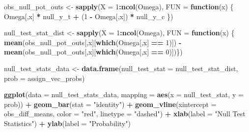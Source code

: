 \documentclass[12pt,leqno]{article}
\newenvironment{Shaded}{\begin{snugshade}}{\end{snugshade}}
\newcommand{\ControlFlowTok}[1]{\textcolor[rgb]{0.13,0.29,0.53}{\textbf{#1}}}
\newcommand{\DataTypeTok}[1]{\textcolor[rgb]{0.13,0.29,0.53}{#1}}
\newcommand{\DecValTok}[1]{\textcolor[rgb]{0.00,0.00,0.81}{#1}}
\newcommand{\KeywordTok}[1]{\textcolor[rgb]{0.13,0.29,0.53}{\textbf{#1}}}
\newcommand{\NormalTok}[1]{#1}
\newcommand{\OperatorTok}[1]{\textcolor[rgb]{0.81,0.36,0.00}{\textbf{#1}}}
\newcommand{\StringTok}[1]{\textcolor[rgb]{0.31,0.60,0.02}{#1}}
\theoremstyle{newstyle}
\begin{document}
\begin{Shaded}
\begin{Highlighting}[]
\NormalTok{obs\_null\_pot\_outs \textless{}{-}}\StringTok{ }\KeywordTok{sapply}\NormalTok{(}\DataTypeTok{X =} \DecValTok{1}\OperatorTok{:}\KeywordTok{ncol}\NormalTok{(Omega),}
                            \DataTypeTok{FUN =} \ControlFlowTok{function}\NormalTok{(x) \{ Omega[,x] }\OperatorTok{*}\StringTok{ }\NormalTok{null\_y\_t }\OperatorTok{+}\StringTok{ }\NormalTok{(}\DecValTok{1} \OperatorTok{{-}}\StringTok{ }\NormalTok{Omega[,x]) }\OperatorTok{*}\StringTok{ }\NormalTok{null\_y\_c \})}

\NormalTok{null\_test\_stat\_dist \textless{}{-}}\StringTok{ }\KeywordTok{sapply}\NormalTok{(}\DataTypeTok{X =} \DecValTok{1}\OperatorTok{:}\KeywordTok{ncol}\NormalTok{(Omega),}
                              \DataTypeTok{FUN =} \ControlFlowTok{function}\NormalTok{(x) \{ }\KeywordTok{mean}\NormalTok{(obs\_null\_pot\_outs[,x][}\KeywordTok{which}\NormalTok{(Omega[,x] }\OperatorTok{==}\StringTok{ }\DecValTok{1}\NormalTok{)]) }\OperatorTok{{-}}
\StringTok{                                  }\KeywordTok{mean}\NormalTok{(obs\_null\_pot\_outs[,x][}\KeywordTok{which}\NormalTok{(Omega[,x] }\OperatorTok{==}\StringTok{ }\DecValTok{0}\NormalTok{)])\})}

\NormalTok{null\_test\_stats\_data \textless{}{-}}\StringTok{ }\KeywordTok{data.frame}\NormalTok{(}\DataTypeTok{null\_test\_stat =}\NormalTok{ null\_test\_stat\_dist,}
                                   \DataTypeTok{prob =}\NormalTok{ assign\_vec\_probs)}
\end{Highlighting}
\end{Shaded}

\begin{Shaded}
\begin{Highlighting}[]
\KeywordTok{ggplot}\NormalTok{(}\DataTypeTok{data =}\NormalTok{ null\_test\_stats\_data,}
                         \DataTypeTok{mapping =} \KeywordTok{aes}\NormalTok{(}\DataTypeTok{x =}\NormalTok{ null\_test\_stat,}
                                       \DataTypeTok{y =}\NormalTok{ prob)) }\OperatorTok{+}
\StringTok{  }\KeywordTok{geom\_bar}\NormalTok{(}\DataTypeTok{stat =} \StringTok{"identity"}\NormalTok{) }\OperatorTok{+}
\StringTok{  }\KeywordTok{geom\_vline}\NormalTok{(}\DataTypeTok{xintercept =}\NormalTok{ obs\_diff\_means,}
             \DataTypeTok{color =} \StringTok{"red"}\NormalTok{,}
             \DataTypeTok{linetype =} \StringTok{"dashed"}\NormalTok{) }\OperatorTok{+}
\StringTok{  }\KeywordTok{xlab}\NormalTok{(}\DataTypeTok{label =} \StringTok{"Null Test Statistics"}\NormalTok{) }\OperatorTok{+}
\StringTok{  }\KeywordTok{ylab}\NormalTok{(}\DataTypeTok{label =} \StringTok{"Probability"}\NormalTok{)}
\end{Highlighting}
\end{Shaded}
\end{document}

